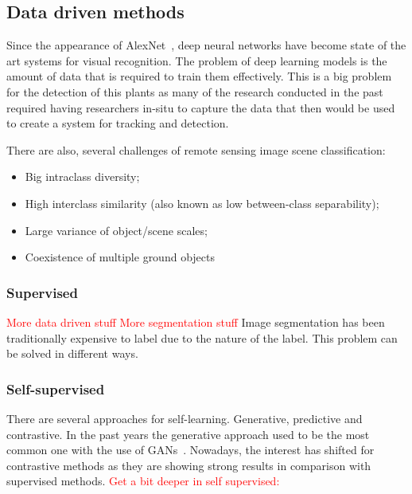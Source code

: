 \documentclass[conference]{IEEEtran}
\begin{document}
    \subsection*{Data driven methods}
    Since the appearance of AlexNet~\cite{NIPS2012_c399862d}, deep neural networks have become state of the art systems for visual recognition.
    The problem of deep learning models is the amount of data that is required to train them effectively.
    This is a big problem for the detection of this plants as many of the research conducted in the past required having researchers in-situ to capture the data that then
    would be used to create a system for tracking and detection.

    There are also, several challenges of remote sensing image scene classification\cite{9127795}:
    \begin{itemize}
        \item Big intraclass diversity;
        \item High interclass similarity (also known as low between-class separability);
        \item Large variance of object/scene scales;
        \item Coexistence of multiple ground objects
    \end{itemize}

    \subsubsection*{Supervised}

    \textcolor{red}{More data driven stuff\cite{9127795, Mendieta2023GFMBG, jean2019tile2vec, akiva2020h2onet}}
    \textcolor{red}{More segmentation stuff \cite{Li_2022, inproceedings, 9460820, kirillov2023segment, akiva2020h2onet, 10135093}}
    Image segmentation has been traditionally expensive to label due to the nature of the label.
    This problem can be solved in different ways.

    \subsubsection*{Self-supervised}

    There are several approaches for self-learning.
    Generative, predictive and contrastive.
    In the past years the generative approach used to be the most common one with the use of GANs~\cite{goodfellow2014generative, radford2016unsupervised}.
    Nowadays, the interest has shifted for contrastive methods as they are showing strong results in comparison with supervised methods.
    \textcolor{red}{Get a bit deeper in self supervised: \cite{wang2022selfsupervised, DINO, barlowtwins, Li_2022, grill2020bootstrap, Jung2021SelfsupervisedLW, li2022efficient, caron2021unsupervised, inproceedings, 9460820}}
\end{document}
